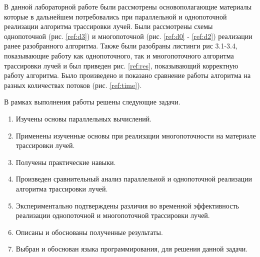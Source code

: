 \Conclusion %

В данной лабораторной работе были рассмотрены
основополагающие материалы которые в дальнейшем потребовались
при параллельной и однопоточной реализации алгоритма трассировки лучей.
Были рассмотрены схемы однопоточной (рис. \ref{ref:d3}) и многопоточной
(рис. \ref{ref:d0} - \ref{ref:d2}) реализации ранее разобранного алгоритма.
Также были разобраны листинги рис 3.1-3.4, показывающие работу как однопоточного, так и многопоточного
алгоритма трассировки лучей и был приведен рис. \ref{ref:res}, показывающий корректную работу алгоритма.
Было произведено и показано сравнение работы алгоритма на разных количествах потоков (рис. \ref{ref:time}).

В рамках выполнения работы решены следующие задачи.

\begin{enumerate}
	\item Изучены основы параллельных вычислений.
	\item Применены изученные основы при реализации многопоточности на материале трассировки лучей.
	\item Получены практические навыки.
	\item Произведен сравнительный анализ параллельной и однопоточной реализации алгоритма трассировки лучей.
	\item Экспериментально подтверждены различия во временной эффективность реализации однопоточной и многопоточной трассировки лучей.
	\item Описаны и обоснованы полученные результаты.
	\item Выбран и обоснован языка программирования, для решения данной задачи.
\end{enumerate}
